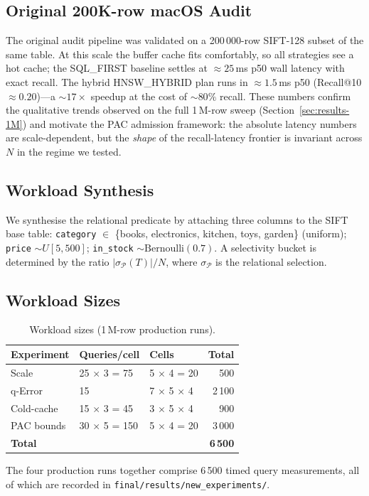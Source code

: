 \documentclass[conference]{IEEEtran}
\begin{document}
\subsection{Original 200K-row macOS Audit}
The original audit pipeline was validated on a 200\,000-row SIFT-128
subset of the same table.  At this scale the buffer cache fits
comfortably, so all strategies see a hot cache; the
SQL\_FIRST baseline settles at $\approx 25$\,ms p50 wall latency
with exact recall.  The hybrid HNSW\_HYBRID plan runs in
$\approx 1.5$\,ms p50 (Recall@10 $\approx 0.20$)---a $\sim 17\times$
speedup at the cost of $\sim 80\%$ recall.  These numbers confirm
the qualitative trends observed on the full 1\,M-row sweep
(Section~\ref{sec:results-1M}) and motivate the PAC admission
framework: the absolute latency numbers are scale-dependent, but
the \emph{shape} of the recall-latency frontier is invariant
across $N$ in the regime we tested.

\subsection{Workload Synthesis}
We synthesise the relational predicate by attaching three columns
to the SIFT base table:
\texttt{category} $\in$ \{books, electronics, kitchen, toys, garden\}
(uniform); \texttt{price} $\sim U[5, 500]$; \texttt{in\_stock}
$\sim \text{Bernoulli}(0.7)$.  A selectivity bucket is determined
by the ratio $|\sigma_{\mathcal{P}}(T)| / N$, where
$\sigma_{\mathcal{P}}$ is the relational selection.

\subsection{Workload Sizes}
\begin{table}[h]
\centering
\caption{Workload sizes (1\,M-row production runs).}
\label{tab:workload}
\small
\setlength{\tabcolsep}{3pt}
\begin{tabular}{l l l r}
\hline
\textbf{Experiment} & \textbf{Queries/cell} & \textbf{Cells} & \textbf{Total} \\
\hline
Scale      & 25 $\times$ 3 = 75  & 5 $\times$ 4 = 20        &   500 \\
q-Error    & 15                  & 7 $\times$ 5 $\times$ 4  & 2\,100 \\
Cold-cache & 15 $\times$ 3 = 45  & 3 $\times$ 5 $\times$ 4  &   900 \\
PAC bounds & 30 $\times$ 5 = 150 & 5 $\times$ 4 = 20        & 3\,000 \\
\hline
\textbf{Total} & & & \textbf{6\,500} \\
\hline
\end{tabular}
\end{table}
The four production runs together comprise 6\,500 timed query
measurements, all of which are recorded in
\texttt{final/results/new\_experiments/}.
\end{document}
